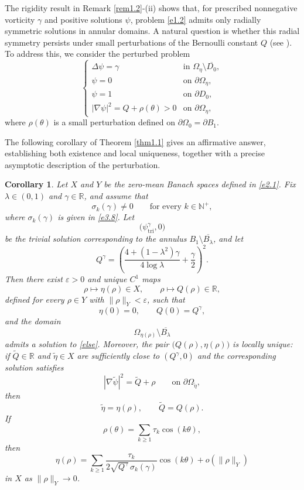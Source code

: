 \documentclass[reqno]{amsart}
\numberwithin{equation}{section}
\newtheorem{corollary}[theorem]{Corollary}
\numberwithin{equation}{section}
\numberwithin{equation}{section}
\begin{document}
The rigidity result in Remark \ref{rem1.2}-(ii) shows that, for prescribed nonnegative vorticity \(\gamma\) and positive solutions \(\psi\), problem \eqref{e1.2} admits only radially symmetric solutions in annular domains.
A natural question is whether this radial symmetry persists under small perturbations of the Bernoulli constant \(Q\) (see \cite{GilsbachO, Onodera}). To address this, we consider the perturbed problem
\begin{equation}\label{else}
\begin{cases}
\Delta \psi = \gamma & \text{in } \Omega_\eta \setminus \overline{D_0}, \\
\psi = 0 & \text{on } \partial \Omega_\eta, \\
\psi = 1 & \text{on } \partial D_0, \\
|\nabla \psi|^2 = Q + \rho(\theta) > 0 & \text{on } \partial \Omega_\eta,
\end{cases}
\end{equation}
where \(\rho(\theta)\) is a small perturbation defined on \(\partial \Omega_0 = \partial B_1\).

The following corollary of Theorem \ref{thm1.1} gives an affirmative answer, establishing both existence and local uniqueness, together with a precise asymptotic description of the perturbation.

\begin{corollary}\label{co}
Let $X$ and $Y$ be the zero-mean Banach spaces defined in \eqref{e2.1}.
Fix $\lambda\in(0,1)$ and $\gamma\in\mathbb R$, and assume that
\[ \sigma_k(\gamma)\neq0 \qquad\text{for every }k\in\mathbb N^+, \]
where $\sigma_k(\gamma)$ is given in \eqref{e3.8}.
Let
\[ \bigl(\psi_{\mathrm{tri}}^\gamma,0\bigr) \]
be the trivial solution corresponding to the annulus $B_1\setminus\overline{B_\lambda}$, and let
\[ Q^\gamma = \left( \frac{4+(1-\lambda^2)\gamma}{4\log\lambda} +\frac{\gamma}{2} \right)^2. \]
Then there exist $\varepsilon>0$ and unique $C^1$ maps
\[ \rho\longmapsto \eta(\rho)\in X, \qquad \rho\longmapsto Q(\rho)\in\mathbb R, \]
defined for every $\rho\in Y$ with $\|\rho\|_Y<\varepsilon$,
such that
\[ \eta(0)=0, \qquad Q(0)=Q^\gamma, \]
and the domain
 \[ \Omega_{\eta(\rho)}\setminus\overline{B_\lambda} \]
 admits a solution to \eqref{else}.
Moreover, the pair $\bigl(Q(\rho),\eta(\rho)\bigr)$ is locally unique:
if $\widetilde Q\in\mathbb R$ and $\widetilde\eta\in X$ are sufficiently close to $(Q^\gamma,0)$ and the corresponding solution satisfies
\[ |\nabla\widetilde\psi|^2 = \widetilde Q+\rho \qquad\text{on }\partial\Omega_{\widetilde\eta}, \]
then
\[ \widetilde\eta=\eta(\rho), \qquad \widetilde Q=Q(\rho). \]
If
\[ \rho(\theta) = \sum_{k\geq1}\tau_k\cos(k\theta), \]
then
\[ \eta(\rho) = \sum_{k\geq1} \frac{\tau_k} {2\sqrt{Q^\gamma}\,\sigma_k(\gamma)} \cos(k\theta) + o(\|\rho\|_Y) \]
in $X$ as $\|\rho\|_Y\to0$.
\end{corollary}
\end{document}
